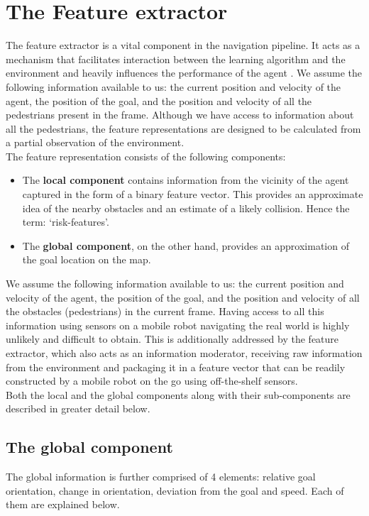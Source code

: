\section{The Feature extractor}
The feature extractor is a vital component in the navigation pipeline. It acts as a mechanism that facilitates interaction between the learning algorithm and the environment and heavily influences the performance of the agent \cite{vasquez_inverse_2014}. We assume the following information available to us: the current position and velocity of the agent, the position of the goal, and the position and velocity of all the pedestrians present in the frame. Although we have access to information about all the pedestrians, the feature representations are designed to be calculated from a partial observation of the environment.\\
The feature representation consists of the following components:
\begin{itemize}
    \item The \textbf{local component} contains information from the vicinity of the agent captured in the form of a binary feature vector. This provides an approximate idea of the nearby obstacles and an estimate of a likely collision. Hence the term: `risk-features'. 
    \item The \textbf{global component}, on the other hand, provides an approximation of the goal location on the map. 
\end{itemize}
 We assume the following information available to us: the current position and velocity of the agent, the position of the goal, and the position and velocity of all the obstacles (pedestrians) in the current frame.  Having access to all this information using sensors on a mobile robot navigating the real world is highly unlikely and difficult to obtain. This is additionally addressed by the feature extractor, which also acts as an information moderator, receiving raw information from the environment and packaging it in a feature vector that can be readily constructed by a mobile robot on the go using off-the-shelf sensors.\\
 Both the local and the global components along with their sub-components are described in greater detail below.

\subsection*{The global component}
The global information is further comprised of 4 elements: relative goal orientation, change in orientation, deviation from the goal and speed. Each of them are explained below.
